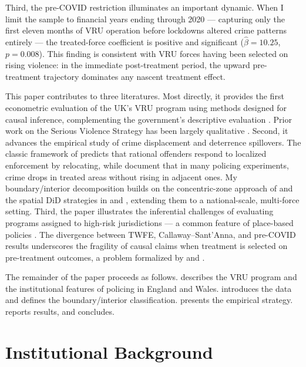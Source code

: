 \documentclass[12pt]{article}
\begin{document}
Third, the pre-COVID restriction illuminates an important dynamic. When I limit the sample to financial years ending through 2020 --- capturing only the first eleven months of VRU operation before lockdowns altered crime patterns entirely --- the treated-force coefficient is positive and significant ($\hat\beta = 10.25$, $p = 0.008$). This finding is consistent with VRU forces having been selected on rising violence: in the immediate post-treatment period, the upward pre-treatment trajectory dominates any nascent treatment effect.

This paper contributes to three literatures. Most directly, it provides the first econometric evaluation of the UK's VRU program using methods designed for causal inference, complementing the government's descriptive evaluation \citep{homeoffice2022vru}. Prior work on the Serious Violence Strategy has been largely qualitative \citep{iriss2020vru, wong2019vru}. Second, it advances the empirical study of crime displacement and deterrence spillovers. The classic framework of \citet{cornish1987reasoning} predicts that rational offenders respond to localized enforcement by relocating, while \citet{weisburd2006displacement} document that in many policing experiments, crime drops in treated areas without rising in adjacent ones. My boundary/interior decomposition builds on the concentric-zone approach of \citet{bowers2003measuring} and the spatial DiD strategies in \citet{draca2011panic} and \citet{difeliciantonio2022organized}, extending them to a national-scale, multi-force setting. Third, the paper illustrates the inferential challenges of evaluating programs assigned to high-risk jurisdictions --- a common feature of place-based policies \citep{busso2013assessing, kline2013place}. The divergence between TWFE, Callaway--Sant'Anna, and pre-COVID results underscores the fragility of causal claims when treatment is selected on pre-treatment outcomes, a problem formalized by \citet{callaway2021did} and \citet{sun2021estimating}.

The remainder of the paper proceeds as follows.  describes the VRU program and the institutional features of policing in England and Wales.  introduces the data and defines the boundary/interior classification.  presents the empirical strategy.  reports results, and  concludes.


\section{Institutional Background}
\label{sec:background}
\end{document}
